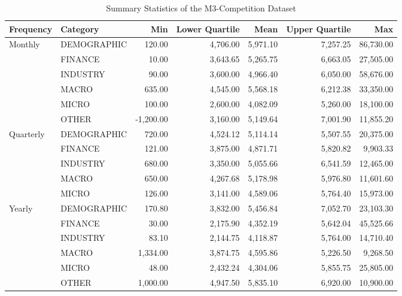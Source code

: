 \documentclass[12pt,a4paper]{article}
\begin{document}
\begin{table}[htbp]
  \centering
  \caption{Summary Statistics of the M3-Competition Dataset}
  \label{summary_statistics}
  \begin{tabular}{llrrrrr}
  \toprule
  \textbf{Frequency} & \textbf{Category} & \textbf{Min} & \textbf{Lower Quartile} & \textbf{Mean} & \textbf{Upper Quartile} & \textbf{Max} \\
  \midrule
  \multirow{6}{*}{Monthly} & DEMOGRAPHIC & 120.00 & 4,706.00 & 5,971.10 & 7,257.25 & 86,730.00 \\
                           & FINANCE     & 10.00  & 3,643.65 & 5,265.75 & 6,663.05 & 27,505.00 \\
                           & INDUSTRY    & 90.00  & 3,600.00 & 4,966.40 & 6,050.00 & 58,676.00 \\
                           & MACRO       & 635.00 & 4,545.00 & 5,568.18 & 6,212.38 & 33,350.00 \\
                           & MICRO       & 100.00 & 2,600.00 & 4,082.09 & 5,260.00 & 18,100.00 \\
                           & OTHER       & -1,200.00 & 3,160.00 & 5,149.64 & 7,001.90 & 11,855.20 \\
  \midrule
  \multirow{5}{*}{Quarterly} & DEMOGRAPHIC & 720.00 & 4,524.12 & 5,114.14 & 5,507.55 & 20,375.00 \\
                             & FINANCE     & 121.00 & 3,875.00 & 4,871.71 & 5,820.82 & 9,903.33 \\
                             & INDUSTRY    & 680.00 & 3,350.00 & 5,055.66 & 6,541.59 & 12,465.00 \\
                             & MACRO       & 650.00 & 4,267.68 & 5,178.98 & 5,976.80 & 11,601.60 \\
                             & MICRO       & 126.00 & 3,141.00 & 4,589.06 & 5,764.40 & 15,973.00 \\
  \midrule
  \multirow{6}{*}{Yearly} & DEMOGRAPHIC & 170.80 & 3,832.00 & 5,456.84 & 7,052.70 & 23,103.30 \\
                          & FINANCE     & 30.00  & 2,175.90 & 4,352.19 & 5,642.04 & 45,525.66 \\
                          & INDUSTRY    & 83.10  & 2,144.75 & 4,118.87 & 5,764.00 & 14,710.40 \\
                          & MACRO       & 1,334.00 & 3,874.75 & 4,595.86 & 5,226.50 & 9,268.50 \\
                          & MICRO       & 48.00  & 2,432.24 & 4,304.06 & 5,855.75 & 25,805.00 \\
                          & OTHER       & 1,000.00 & 4,947.50 & 5,835.10 & 6,920.00 & 10,900.00 \\
  \bottomrule
  \end{tabular}
\end{table}
\end{document}
